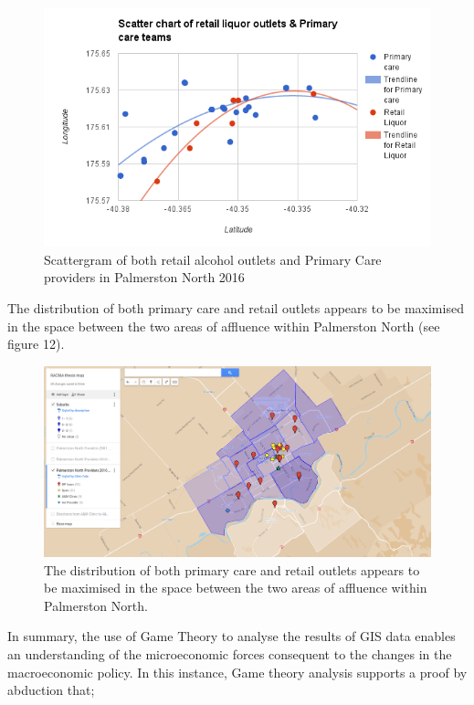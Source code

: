 \documentclass[11pt,a4paper]{article}
\begin{document}
\begin{figure}[htp]
\centering
\includegraphics[scale=0.6]{Nash_GP_retail.png}
\caption{ Scattergram of both retail alcohol outlets and Primary Care providers in Palmerston North 2016}
\label{Geographic distribution of practices by 2016, with retail outlets overlaid}
\end{figure}

The distribution of both primary care and retail outlets appears to be maximised in the space between the two areas of affluence within Palmerston North (see figure 12).\\

\begin{figure}[htp]
\centering
\includegraphics[scale=0.40]{fig12.png}
\caption{The distribution of both primary care and retail outlets appears to be maximised in the space between the two areas of affluence within Palmerston North.}
\label{Distribution of General Practitioners overlaid on suburb's social deprivation}
\end{figure}

\pagebreak

In summary, the use of Game Theory to analyse the results of GIS data enables an understanding of the microeconomic forces consequent to the changes in the macroeconomic policy. In this instance, Game theory analysis supports a proof by abduction that;
\end{document}
